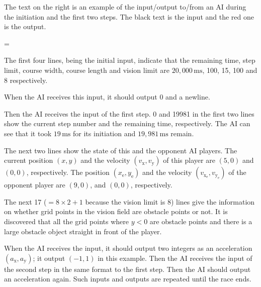 \documentclass[11pt]{article}
\begin{document}
\begin{minipage}[t]{.6\textwidth}

The text on the right is an example of the input/output to/from an AI
during the initiation and the first two steps.
The black text is the input and the red one is the output.

\parindent=

The first four lines, being the initial input, indicate that
the remaining time, step limit, course width, course length and vision limit
are $20,000\,\si{\milli\second}$, 100, 15, 100 and 8 respectively.

When the AI receives this input, it should output 0 and a newline.

Then the AI receives the input of the first step.
0 and 19981 in the first two lines show the current step number
and the remaining time, respectively.
The AI can see that it took $19\,\si{\milli\second}$ for its initiation and
$19,981\,\si{\milli\second}$ remain.

The next two lines show the state of this and the opponent AI players.
The current position $(x,y)$ and the velocity $(v_\mathrm{x},v_\mathrm{y})$ of this player are $(5,0)$ and
$(0,0)$, respectively.
The position $(x_\mathrm{e},y_\mathrm{e})$ and the velocity $(v_{\mathrm{x}_\mathrm{e}},v_{\mathrm{y}_\mathrm{e}})$ of the opponent player are
$(9,0)$, and $(0,0)$, respectively.

The next 17 ($=8 \times 2 + 1$ because the vision limit is 8) lines give the information on whether grid points in the vision field are obstacle points or not.
It is discovered that all the grid points where $y < 0$ are obstacle points
and there is a large obstacle object straight in front of the player.

When the AI receives the input, it should output two integers as an acceleration $(a_\mathrm{x}, a_\mathrm{y})$;
it output $(-1,1)$ in this example.
Then the AI receives the input of the second step
in the same format to the first step.
Then the AI should output an acceleration again.
Such inputs and outputs are repeated until the race ends.

\end{minipage}
 \hfill
\end{document}
